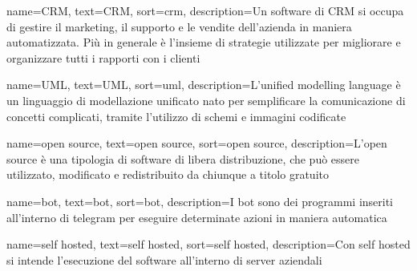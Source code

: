 

%

 {
    name=CRM,
    text=CRM,
    sort=crm,
    description={Un software di CRM si occupa di gestire il marketing, il supporto e le vendite dell'azienda in maniera automatizzata. Più in generale è l'insieme di strategie utilizzate per migliorare e organizzare tutti i rapporti con i clienti}
}

 {
    name=UML,
    text=UML,
    sort=uml,
    description={L'unified modelling language è un linguaggio di modellazione unificato nato per semplificare la comunicazione di concetti complicati, tramite l'utilizzo di schemi e immagini codificate}
}

 {
    name=open source,
    text=open source,
    sort=open source,
    description={L'open source è una tipologia di software di libera distribuzione, che può essere utilizzato, modificato e redistribuito da chiunque a titolo gratuito}
}

 {
    name=bot,
    text=bot,
    sort=bot,
    description={I bot sono dei programmi inseriti all'interno di telegram per eseguire determinate azioni in maniera automatica}
}

 {
    name=self hosted,
    text=self hosted,
    sort=self hosted,
    description={Con self hosted si intende l'esecuzione del software all'interno di server aziendali}
}

